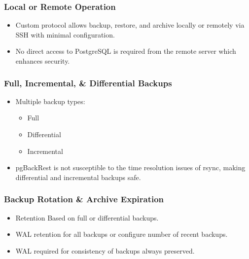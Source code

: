 \begin{frame}
    \frametitle{Local or Remote Operation}

    \begin{itemize}
        \item Custom protocol allows backup, restore, and archive locally or remotely via SSH with minimal configuration.\pause
        \item No direct access to PostgreSQL is required from the remote server which enhances security.
    \end{itemize}
\end{frame}

\begin{frame}
    \frametitle{Full, Incremental, \& Differential Backups}

    \begin{itemize}
        \item Multiple backup types:\pause

            \begin{itemize}
                \item Full\pause
                \item Differential\pause
                \item Incremental\pause
            \end{itemize}

        \item pgBackRest is not susceptible to the time resolution issues of rsync, making differential and incremental backups safe.
    \end{itemize}
\end{frame}

\begin{frame}
    \frametitle{Backup Rotation \& Archive Expiration}

    \begin{itemize}
        \item Retention Based on full or differential backups.\pause
        \item WAL retention for all backups or configure number of recent backups.\pause
        \item WAL required for consistency of backups always preserved.
    \end{itemize}
\end{frame}

